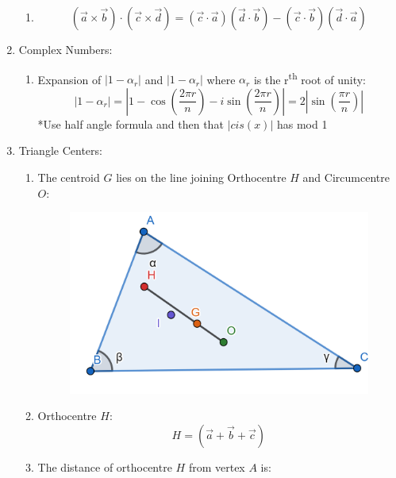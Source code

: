 \documentclass{article}
\numberwithin{equation}{section}
\numberwithin{figure}{section}
\newcommand{\Cr}{\times}
\begin{document}
\begin{enumerate}
\begin{enumerate}
			\item \begin{equation}
					(\vec{a} \Cr \vec{b}) \cdot (\vec{c} \Cr \vec{d})=(\vec{c} \cdot \vec{a})(\vec{d}\cdot\vec{b})-(\vec{c}\cdot\vec{b})(\vec{d}\cdot\vec{a})
				\end{equation}
		\end{enumerate}
	\item Complex Numbers:
		\begin{enumerate}
			\item Expansion of $|1-\alpha_r|$ and $|1-\alpha_r|$ where $\alpha_r$ is the r\textsuperscript{th} root of unity:
				\begin{equation}
					|1-\alpha_r|=\left|1-\cos\left(\frac{2\pi r}{n}\right)-i\sin\left(\frac{2\pi r}{n}\right)\right|=2\left| \sin\left(\frac{\pi r}{n}\right)\right|
				\end{equation}
			*Use half angle formula and then that $|cis(x)|$ has mod 1
		\end{enumerate}
	\item Triangle Centers:
		\begin{enumerate}
			\item The centroid $G$ lies on the line joining Orthocentre $H$ and Circumcentre $O$:
				\begin{centering}
					\begin{figure}[h]
						\includegraphics[scale=0.25]{Triangle_Pic.png}
					\end{figure}
				\end{centering}
			\item Orthocentre $H$: \begin{equation}H= \left(\vec{a}+\vec{b}+\vec{c}\right)\end{equation}
			\item The distance of orthocentre $H$ from vertex $A$ is:

\end{enumerate}
\end{enumerate}
\end{document}
